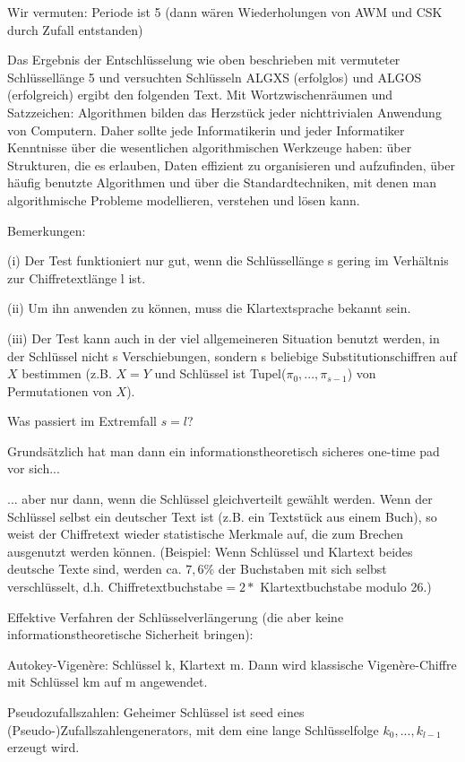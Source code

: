 \documentclass[a4paper]{article}
\begin{document}
\begin{multicols}{3}
    Wir vermuten: Periode ist 5 (dann wären Wiederholungen von AWM und CSK durch Zufall entstanden)

    Das Ergebnis der Entschlüsselung wie oben beschrieben mit vermuteter Schlüssellänge 5 und versuchten Schlüsseln ALGXS (erfolglos) und ALGOS (erfolgreich) ergibt den folgenden Text. Mit Wortzwischenräumen und Satzzeichen:
    Algorithmen bilden das Herzstück jeder nichttrivialen Anwendung von Computern. Daher sollte jede Informatikerin und jeder Informatiker Kenntnisse über die wesentlichen algorithmischen Werkzeuge haben: über Strukturen, die es erlauben, Daten effizient zu organisieren und aufzufinden, über häufig benutzte Algorithmen und über die Standardtechniken, mit denen man algorithmische Probleme modellieren, verstehen und lösen kann.

    Bemerkungen:
    \begin{itemize*}
        \item (i) Der Test funktioniert nur gut, wenn die Schlüssellänge s gering im Verhältnis zur Chiffretextlänge l ist.
        \item (ii) Um ihn anwenden zu können, muss die Klartextsprache bekannt sein.
        \item (iii) Der Test kann auch in der viel allgemeineren Situation benutzt werden, in der Schlüssel nicht s Verschiebungen, sondern s beliebige Substitutionschiffren auf $X$ bestimmen (z.B. $X=Y$ und Schlüssel ist Tupel($\pi_0,...,\pi_{s-1}$) von Permutationen von $X$).
    \end{itemize*}

    Was passiert im Extremfall $s=l$?
    \begin{itemize*}
        \item Grundsätzlich hat man dann ein informationstheoretisch sicheres one-time pad vor sich...
        \item ... aber nur dann, wenn die Schlüssel gleichverteilt gewählt werden. Wenn der Schlüssel selbst ein deutscher Text ist (z.B. ein Textstück aus einem Buch), so weist der Chiffretext wieder statistische Merkmale auf, die zum Brechen ausgenutzt werden können. (Beispiel: Wenn Schlüssel und Klartext beides deutsche Texte sind, werden ca. $7,6\%$ der Buchstaben mit sich selbst verschlüsselt, d.h. Chiffretextbuchstabe$= 2 *$ Klartextbuchstabe modulo 26.)
    \end{itemize*}

    Effektive Verfahren der Schlüsselverlängerung (die aber keine informationstheoretische Sicherheit bringen):
    \begin{itemize*}
        \item Autokey-Vigenère: Schlüssel k, Klartext m. Dann wird klassische Vigenère-Chiffre mit Schlüssel km auf m angewendet.
        \item Pseudozufallszahlen: Geheimer Schlüssel ist seed eines (Pseudo-)Zufallszahlengenerators, mit dem eine lange Schlüsselfolge $k_0,...,k_{l-1}$ erzeugt wird.
    \end{itemize*}


\end{multicols}
\end{document}
